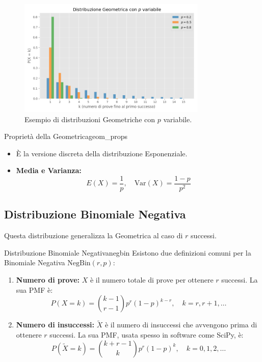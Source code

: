 \begin{figure}[H]
    \centering
    \includegraphics[width=0.8\textwidth]{images/geometrica.png}
    \caption{Esempio di distribuzioni Geometriche con \(p\) variabile.}
    \label{fig:geometrica}
\end{figure}

\begin{proposizione}{Proprietà della Geometrica}{geom_props}
\begin{itemize}
    \item È la versione discreta della distribuzione Esponenziale.
    \item \textbf{Media e Varianza:}
    \[ E(X) = \frac{1}{p}, \quad \text{Var}(X) = \frac{1-p}{p^2} \]
\end{itemize}
\end{proposizione}

\subsection{Distribuzione Binomiale Negativa}
Questa distribuzione generalizza la Geometrica al caso di \(r\) successi.

\begin{definizione}{Distribuzione Binomiale Negativa}{negbin}
Esistono due definizioni comuni per la Binomiale Negativa \(\text{NegBin}(r,p)\):
\begin{enumerate}
    \item \textbf{Numero di prove:} \(X\) è il numero totale di prove per ottenere \(r\) successi. La sua PMF è:
    \[ P(X=k) = \binom{k-1}{r-1}p^r(1-p)^{k-r}, \quad k=r, r+1, \dots \]
    \item \textbf{Numero di insuccessi:} \(\tilde{X}\) è il numero di insuccessi che avvengono prima di ottenere \(r\) successi. La sua PMF, usata spesso in software come SciPy, è:
    \[ P(\tilde{X}=k) = \binom{k+r-1}{k}p^r(1-p)^{k}, \quad k=0, 1, 2, \dots \]
\end{enumerate}
\end{definizione}

